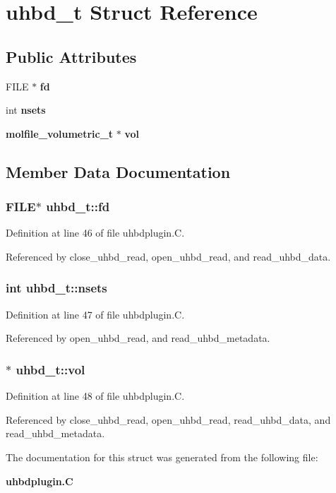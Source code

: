 \section{uhbd\_\-t  Struct Reference}
\label{structuhbd__t}
\subsection*{Public Attributes}
\begin{CompactItemize}
\item 
FILE $\ast$ {\bf fd}
\item 
int {\bf nsets}
\item 
{\bf molfile\_\-volumetric\_\-t} $\ast$ {\bf vol}
\end{CompactItemize}


\subsection{Member Data Documentation}
\subsubsection{\setlength{\rightskip}{0pt plus 5cm}FILE$\ast$ uhbd\_\-t::fd}\label{structuhbd__t_m0}




Definition at line 46 of file uhbdplugin.C.

Referenced by close\_\-uhbd\_\-read, open\_\-uhbd\_\-read, and read\_\-uhbd\_\-data.
\subsubsection{\setlength{\rightskip}{0pt plus 5cm}int uhbd\_\-t::nsets}\label{structuhbd__t_m1}




Definition at line 47 of file uhbdplugin.C.

Referenced by open\_\-uhbd\_\-read, and read\_\-uhbd\_\-metadata.
\subsubsection{$\ast$ uhbd\_\-t::vol}\label{structuhbd__t_m2}




Definition at line 48 of file uhbdplugin.C.

Referenced by close\_\-uhbd\_\-read, open\_\-uhbd\_\-read, read\_\-uhbd\_\-data, and read\_\-uhbd\_\-metadata.

The documentation for this struct was generated from the following file:\begin{CompactItemize}
\item 
{\bf uhbdplugin.C}\end{CompactItemize}
